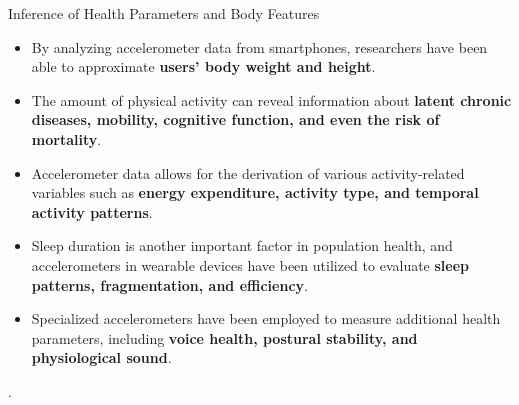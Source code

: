 \documentclass[ucs,9pt]{beamer}
\begin{document}
\begin{frame}{Inference of Health Parameters and Body Features}
\begin{itemize}
	\item By analyzing accelerometer data from smartphones, researchers have
	been able to approximate  \textbf{users’ body weight and height}.
	\item The amount of physical activity can reveal information about \textbf{latent chronic diseases, mobility, cognitive function, and even the risk of mortality}.
	\item Accelerometer data allows for the derivation of various
	activity-related variables such as \textbf{energy expenditure, activity type, and temporal activity patterns}.
	\item Sleep duration is another important factor in population health, and accelerometers in	wearable devices have been utilized to evaluate \textbf{sleep patterns, fragmentation, and efficiency}. 
	\item Specialized accelerometers have been employed to measure additional health parameters, including \textbf{voice health, postural stability, and physiological sound}. 
\end{itemize}.
\end{frame}
\end{document}

